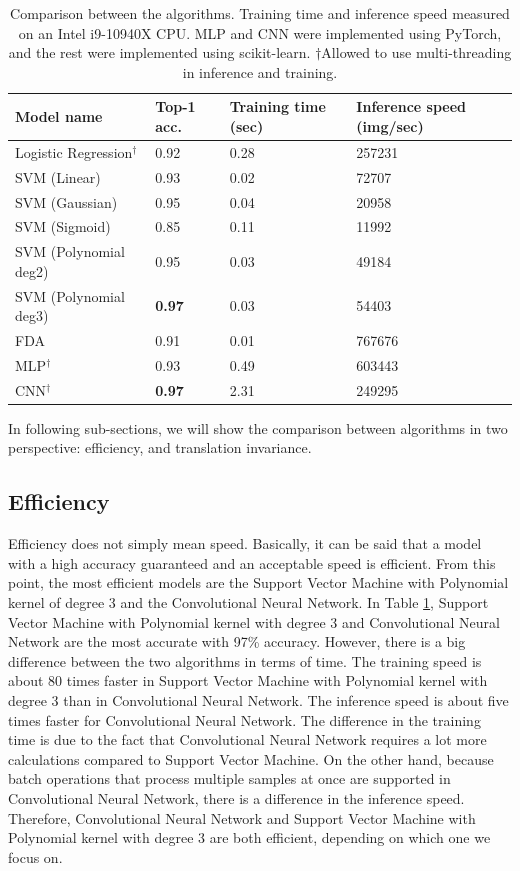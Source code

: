 \documentclass[main.tex]{subfiles}
\begin{document}
\begin{table}[h!]
	\centering
	
	\begin{tabular}{l|l|l|l}
		\toprule
		Model name & Top-1 acc. & Training time (sec) & Inference speed (img/sec) \\
		\midrule
		Logistic Regression${}^\dagger$ & 0.92 & 0.28 & 257231 \\
		\midrule
		SVM (Linear) & 0.93 & 0.02 & 72707 \\
		SVM (Gaussian) & 0.95 & 0.04 & 20958 \\
		SVM (Sigmoid) & 0.85 & 0.11 & 11992 \\
		SVM (Polynomial deg2) & 0.95 & 0.03 & 49184 \\
		SVM (Polynomial deg3) & \textbf{0.97} & 0.03 & 54403 \\
		\midrule
		FDA & 0.91 & 0.01 & 767676 \\
		\midrule
		MLP${}^\dagger$ & 0.93 & 0.49 & 603443 \\
		CNN${}^\dagger$ & \textbf{0.97} & 2.31 & 249295 \\
		\bottomrule
	\end{tabular}

	\vspace{0.2cm}
	\caption{Comparison between the algorithms. Training time and inference speed measured on an Intel i9-10940X CPU. MLP and CNN were implemented using PyTorch, and the rest were implemented using scikit-learn. $\dagger$Allowed to use multi-threading in inference and training.}
	\label{modelcomp}
\end{table}

In following sub-sections, we will show the comparison between algorithms in two perspective: efficiency, and translation invariance.

\subsection{Efficiency}

Efficiency does not simply mean speed.
Basically, it can be said that a model with a high accuracy guaranteed
and an acceptable speed is efficient.
From this point, the most efficient models are the Support Vector Machine with Polynomial kernel of degree 3 and the Convolutional Neural Network.
In Table \ref*{modelcomp}, Support Vector Machine with Polynomial kernel with degree 3 and Convolutional Neural Network are the most accurate with 97\% accuracy.
However, there is a big difference between the two algorithms in terms of time.
The training speed is about 80 times faster in Support Vector Machine with Polynomial kernel with degree 3 than in Convolutional Neural Network.
The inference speed is about five times faster for Convolutional Neural Network.
The difference in the training time is due to the fact that Convolutional Neural Network requires a lot more calculations compared to Support Vector Machine.
On the other hand, because batch operations that process multiple samples at once are supported in Convolutional Neural Network, there is a difference in the inference speed.
Therefore, Convolutional Neural Network and Support Vector Machine with Polynomial kernel with degree 3 are both efficient, depending on which one we focus on.
\end{document}
